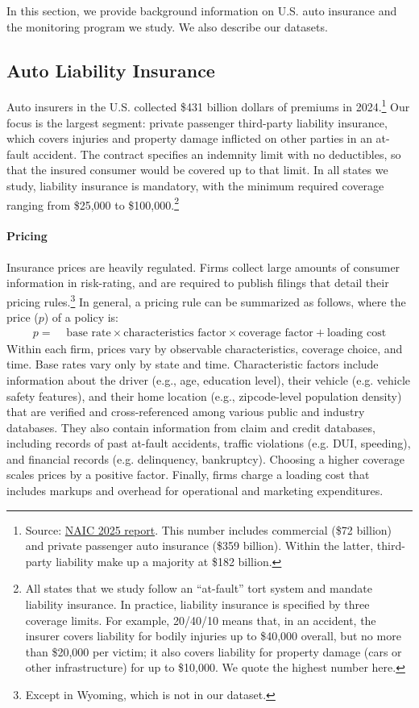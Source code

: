 In this section, we provide background information on U.S. auto insurance and the monitoring program we study. We also describe our datasets.

\subsection{Auto Liability Insurance\label{subsec:bg_pricing}}

Auto insurers in the U.S. collected \$431 billion dollars of premiums in 2024.\footnote{Source: \href{https://content.naic.org/article/naic-releases-2024-market-share-data}{NAIC 2025 report}. This number includes commercial (\$72 billion) and private passenger auto insurance (\$359 billion). Within the latter, third-party liability make up a majority at \$182 billion.} Our focus is the largest segment: private passenger third-party liability insurance, which covers injuries and property damage inflicted on other parties in an at-fault accident.
The contract specifies an indemnity limit with no deductibles, so that the insured consumer would be covered up to that limit.
In all states we study, liability insurance is mandatory, with the minimum required coverage ranging from \$25,000 to \$100,000.\footnote{All states that we study follow an ``at-fault'' tort system and mandate liability insurance. In practice, liability insurance is specified by three coverage limits. For example, 20/40/10 means that, in an accident, the insurer covers liability for bodily injuries up to \$40,000 overall, but no more than \$20,000 per victim; it also covers liability for property damage (cars or other infrastructure) for up to \$10,000. We quote the highest number here.}

\paragraph{Pricing}
Insurance prices are heavily regulated. Firms
collect large amounts of consumer information in risk-rating,
and are required to publish filings that detail their pricing rules.\footnote{Except in Wyoming, which is not in our dataset.}
In general, a pricing rule can be summarized as follows, where the price ($p$) of a policy is:
\begin{align}
p = &\text{ base rate}\times\text{characteristics factor}\times\text{coverage factor} +\text{loading cost} \label{eq:pricing_def} %
\end{align}
Within each firm, prices vary by observable characteristics, coverage choice, and time. Base rates vary only by state and time. Characteristic factors include information about the driver (e.g., age, education level), their vehicle (e.g. vehicle safety features), and their home location (e.g., zipcode-level population density) that are verified and cross-referenced among various public and industry databases. They also contain information from claim and credit databases, including records of past at-fault accidents, traffic violations (e.g. DUI, speeding), and financial  records (e.g. delinquency, bankruptcy).
Choosing a higher coverage scales prices by a positive factor.
Finally, firms charge a loading cost that includes markups and overhead for operational and marketing expenditures.

